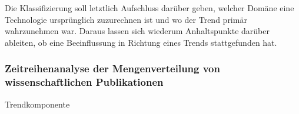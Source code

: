 Die Klassifizierung soll letztlich Aufschluss darüber geben, welcher Domäne eine Technologie ursprünglich zuzurechnen ist und wo der Trend primär wahrzunehmen war. Daraus lassen sich wiederum Anhaltspunkte darüber ableiten, ob eine Beeinflussung in Richtung eines Trends stattgefunden hat.

\subsubsection{Zeitreihenanalyse der Mengenverteilung von wissenschaftlichen Publikationen}
Trendkomponente

%

